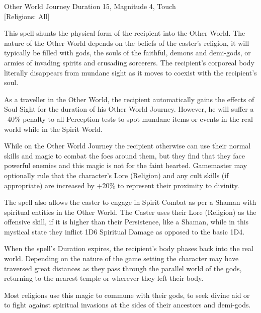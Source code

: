 \begin{samepage}
\begin{rpg-spell}
{Other World Journey}
{Duration 15, Magnitude 4, Touch\\{[Religions: All]}}

This spell shunts the physical form of the recipient into the Other World. The nature of the Other World depends on the beliefs of the caster’s religion, it will typically be filled with gods, the souls of the faithful, demons and demi-gods, or armies of invading spirits and crusading sorcerers. The recipient’s corporeal body literally disappears from mundane sight as it moves to coexist with the recipient’s soul. 

As a traveller in the Other World, the recipient automatically gains the effects of Soul Sight for the duration of his Other World Journey. However, he will suffer a –40\% penalty to all Perception tests to spot mundane items or events in the real world while in the Spirit World. 

While on the Other World Journey the recipient otherwise can use their normal skills and magic to combat the foes around them, but they find that they face powerful enemies and this magic is not for the faint hearted. Gamemaster may optionally rule that the character’s Lore (Religion) and any cult skills (if appropriate) are increased by +20\% to represent their proximity to divinity.

The spell also allows the caster to engage in Spirit Combat as per a Shaman with spiritual entities in the Other World. The Caster uses their Lore (Religion) as the offensive skill, if it is higher than their Persistence, like a Shaman, while in this mystical state they inflict 1D6 Spiritual Damage as opposed to the basic 1D4.

When the spell’s Duration expires, the recipient’s body phases back into the real world. Depending on the nature of the game setting the character may have traversed great distances as they pass through the parallel world of the gods, returning to the nearest temple or wherever they left their body.

Most religions use this magic to commune with their gods, to seek divine aid or to fight against spiritual invasions at the sides of their ancestors and demi-gods.
\end{rpg-spell}
\end{samepage}

